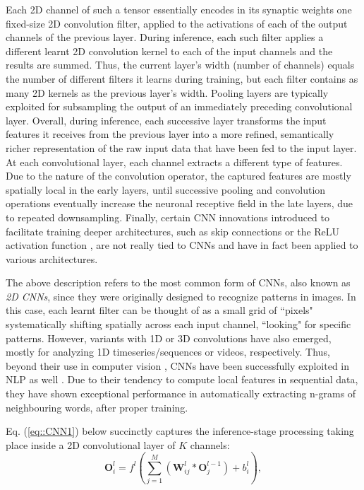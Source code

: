 \documentclass[preprint,review,10pt]{elsarticle}
\begin{document}
	Each 2D channel of such a tensor essentially encodes in its synaptic weights one fixed-size 2D convolution filter, applied to the activations of each of the output channels of the previous layer. During inference, each such filter applies a different learnt 2D convolution kernel to each of the input channels and the results are summed. Thus, the current layer's width (number of channels) equals the number of different filters it learns during training, but each filter contains as many 2D kernels as the previous layer's width. Pooling layers are typically exploited for subsampling the output of an immediately preceding convolutional layer. Overall, during inference, each successive layer transforms the input features it receives from the previous layer into a more refined, semantically richer representation of the raw input data that have been fed to the input layer. At each convolutional layer, each channel extracts a different type of features. Due to the nature of the convolution operator, the captured features are mostly spatially local in the early layers, until successive pooling and convolution operations eventually increase the neuronal receptive field in the late layers, due to repeated downsampling. Finally, certain CNN innovations introduced to facilitate training deeper architectures, such as skip connections \cite{huynh} or the ReLU activation function \cite{alexnet}, are not really tied to CNNs and have in fact been applied to various architectures.
	
	The above description refers to the most common form of CNNs, also known as \textit{2D CNNs}, since they were originally designed to recognize patterns in images. In this case, each learnt filter can be thought of as a small grid of ``pixels" systematically shifting spatially across each input channel, ``looking" for specific patterns. However, variants with 1D or 3D convolutions have also emerged, mostly for analyzing 1D timeseries/sequences or videos, respectively. Thus, beyond their use in computer vision \cite{scuttle} \cite{yang} \cite{patrick}, CNNs have been successfully exploited in NLP as well \cite{dauphin}. Due to their tendency to compute local features in sequential data, they have shown exceptional performance in automatically extracting n-grams of neighbouring words, after proper training.
	
	Eq. (\ref{eq::CNN1}) below succinctly captures the inference-stage processing taking place inside a 2D convolutional layer of $K$ channels:
	\begin{equation}
		\mathbf{O}_i^l = f^l(\sum_{j=1}^M \left(\mathbf{W}_{ij}^l * \mathbf{O}_j^{l-1}\right) + b_i^l),
		\label{eq::CNN1}
	\end{equation}
	
\end{document}
